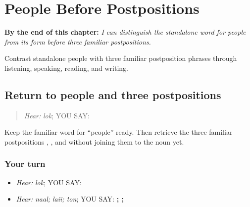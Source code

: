 
\chapter{People Before Postpositions}
\label{ch:pa-a2-lokaan-oblique}

\begin{chapteropening}
\textbf{By the end of this chapter:} \emph{I can distinguish the standalone word for people from its form before three familiar postpositions.}

Contrast standalone people with three familiar postposition phrases through listening, speaking, reading, and writing.
\end{chapteropening}

\section[\texorpdfstring{\pa{ਲੋਕ} · \pa{ਨਾਲ} · \pa{ਲਈ} · \pa{ਤੋਂ} (lok; naal; laii; ton)}{ਲੋਕ · ਨਾਲ · ਲਈ · ਤੋਂ (lok; naal; laii; ton)}]{Return to people and three postpositions}

\label{lesson:PA-C192-lok-return}



\begin{quote}
\emph{Hear:} \emph{lok}; YOU SAY: \textbf{}
\end{quote}

\begin{grammarlens}[title={Grammar Lens}]
Keep the familiar word for “people” ready. Then retrieve the three familiar postpositions \textbf{}, \textbf{}, and \textbf{} without joining them to the noun yet.
\end{grammarlens}

\subsection*{Your turn}
\begin{itemize}
\raggedright
  \item \emph{Hear:} \emph{lok}; YOU SAY: \textbf{}
  \item \emph{Hear:} \emph{naal; laii; ton}; YOU SAY: \textbf{; ; }
\end{itemize}

